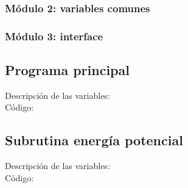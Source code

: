 \documentclass[11pt]{article}
\begin{document}
\subsubsection{Módulo 2: variables comunes}

\subsubsection{Módulo 3: interface}


\subsection{Programa principal}

Descripción de las variables: \\

Código:

\subsection{Subrutina energía potencial}

Descripción de las variables: \\

Código:



\end{document}

